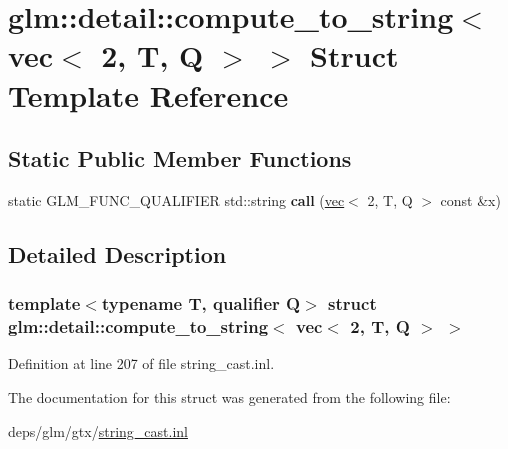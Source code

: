 \hypertarget{structglm_1_1detail_1_1compute__to__string_3_01vec_3_012_00_01T_00_01Q_01_4_01_4}{}\section{glm\+:\+:detail\+:\+:compute\+\_\+to\+\_\+string$<$ vec$<$ 2, T, Q $>$ $>$ Struct Template Reference}
\label{structglm_1_1detail_1_1compute__to__string_3_01vec_3_012_00_01T_00_01Q_01_4_01_4}
\subsection*{Static Public Member Functions}
\begin{DoxyCompactItemize}
\item 
\mbox{\label{structglm_1_1detail_1_1compute__to__string_3_01vec_3_012_00_01T_00_01Q_01_4_01_4_a53a9c1f76338785f54bb2638b69517ef}} 
static G\+L\+M\+\_\+\+F\+U\+N\+C\+\_\+\+Q\+U\+A\+L\+I\+F\+I\+ER std\+::string {\bfseries call} (\hyperlink{structglm_1_1vec}{vec}$<$ 2, T, Q $>$ const \&x)
\end{DoxyCompactItemize}


\subsection{Detailed Description}
\subsubsection*{template$<$typename T, qualifier Q$>$\newline
struct glm\+::detail\+::compute\+\_\+to\+\_\+string$<$ vec$<$ 2, T, Q $>$ $>$}



Definition at line 207 of file string\+\_\+cast.\+inl.



The documentation for this struct was generated from the following file\+:\begin{DoxyCompactItemize}
\item 
deps/glm/gtx/\hyperlink{string__cast_8inl}{string\+\_\+cast.\+inl}\end{DoxyCompactItemize}
